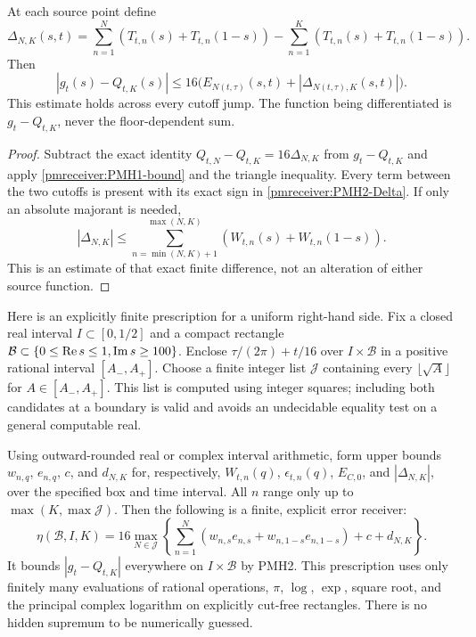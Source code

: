 \begin{pmreceivertheorem}
\label{pmreceiver:PMH2}
At each source point define
\begin{equation}\label{pmreceiver:PMH2-Delta}
 \Delta_{N,K}(s,t)=\sum_{n=1}^N
 (T_{t,n}(s)+T_{t,n}(1-s))-
 \sum_{n=1}^K(T_{t,n}(s)+T_{t,n}(1-s)).
\end{equation}
Then
\begin{equation}\label{pmreceiver:PMH2-bound}
 |g_t(s)-Q_{t,K}(s)|\le
 16\bigl(E_{N(t,\tau)}(s,t)+|\Delta_{N(t,\tau),K}(s,t)|\bigr).
\end{equation}
This estimate holds across every cutoff jump. The function being
differentiated is $g_t-Q_{t,K}$, never the floor-dependent sum.
\end{pmreceivertheorem}
\begin{proof}
Subtract the exact identity
$Q_{t,N}-Q_{t,K}=16\Delta_{N,K}$ from $g_t-Q_{t,K}$ and apply
\eqref{pmreceiver:PMH1-bound} and the triangle inequality. Every term between
the two cutoffs is present with its exact sign in
\eqref{pmreceiver:PMH2-Delta}. If only an absolute majorant is needed,
\[
 |\Delta_{N,K}|\le\sum_{n=\min(N,K)+1}^{\max(N,K)}
           (W_{t,n}(s)+W_{t,n}(1-s)).
\]
This is an estimate of that exact finite difference, not an alteration
of either source function.
\end{proof}

Here is an explicitly finite prescription for a uniform right-hand
side. Fix a closed real interval $I\subset[0,1/2]$ and a compact
rectangle $\mathcal B\subset\{0\le\operatorname{Re} s\le1,\operatorname{Im} s\ge100\}$.
Enclose $\tau/(2\pi)+t/16$ over $I\times\mathcal B$ in a positive
rational interval $[A_-,A_+]$. Choose a finite integer list
$\mathcal J$ containing every $\lfloor\sqrt A\rfloor$ for
$A\in[A_-,A_+]$. This list is computed using integer squares;
including both candidates at a boundary is valid and avoids an
undecidable equality test on a general computable real.

Using outward-rounded real or complex interval arithmetic, form
upper bounds $w_{n,q}$, $e_{n,q}$, $c$, and $d_{N,K}$ for,
respectively, $W_{t,n}(q)$, $\epsilon_{t,n}(q)$,
$E_{C,0}$, and $|\Delta_{N,K}|$, over the specified box and time
interval. All $n$ range only up to $\max(K,\max\mathcal J)$.
Then the following is a finite, explicit error receiver:
\begin{equation}\label{pmreceiver:PMH2-box}
 \eta(\mathcal B,I,K)=16\max_{N\in\mathcal J}
 \left\{\sum_{n=1}^N
 (w_{n,s}e_{n,s}+w_{n,1-s}e_{n,1-s})+c+d_{N,K}\right\}.
\end{equation}
It bounds $|g_t-Q_{t,K}|$ everywhere on $I\times\mathcal B$ by
PMH2. This prescription uses only finitely many evaluations of
rational operations, $\pi$, $\log$, $\exp$, square root, and the
principal complex logarithm on explicitly cut-free rectangles.
There is no hidden supremum to be numerically guessed.

